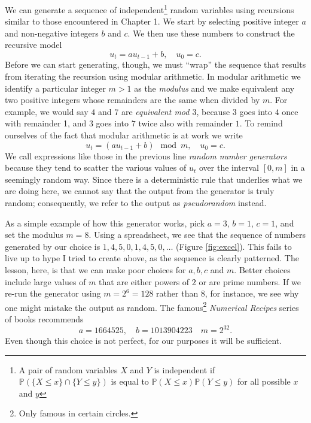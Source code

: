 \documentclass[../book.tex]{subfiles}
\begin{document}
We can generate a sequence of independent\footnote{A pair of random variables \(X\) and \(Y\) is independent if \(\mathbb{P} ( \{ X \leq x\} \cap\{  Y \leq y\} )\) is equal to \(\mathbb{P}(X \leq x) \mathbb{P}(Y\leq y)\) for all possible \(x\) and \(y\)} random variables using recursions similar to those encountered in Chapter 1. We start by selecting positive integer \(a\) and non-negative integers \(b\) and \(c\). We then use these numbers to construct the recursive model
\begin{equation}\label{eq:rv-8}
u_t = a u_{t-1} + b, \quad u_0 = c.
\end{equation}
Before we can start generating, though, we must ``wrap'' the sequence that results from iterating the recursion using modular arithmetic. In modular arithmetic we identify a particular integer \(m>1\) as the \emph{modulus} and we make equivalent any two positive integers whose remainders are the same when divided by \(m\). For example, we would say \(4\) and \(7\) are \emph{equivalent mod \(3\)}, because \(3\) goes into \(4\) once with remainder 1, and \(3\) goes into \(7\) twice also with remainder \(1\). To remind ourselves of the fact that modular arithmetic is at work we write
\begin{equation}\label{eq:rv-9}
u_t = ( a u_{t-1} + b) \mod m, \quad u_0 = c.
\end{equation}
We call expressions like those in the previous line \emph{random number generators} because they tend to scatter the various values of \(u_t\) over the interval \([0,m]\) in a seemingly random way. Since there is a deterministic rule that underlies what we are doing here, we cannot say that the output from the generator is truly random; consequently, we refer to the output as \emph{pseudorandom} instead.

As a simple example of how this generator works, pick \(a=3\), \(b=1\), \(c=1\), and set the modulus \(m=8\). Using a spreadsheet, we see that the sequence of numbers generated by our choice is \(1, 4, 5, 0, 1, 4, 5, 0, \ldots\) (Figure \ref{fig:excel}). This fails to live up to hype I tried to create above, as the sequence is clearly patterned. The lesson, here, is that we can make poor choices for \(a, b, c\) and \(m\). Better choices include large values of \(m\) that are either powers of \(2\) or are prime numbers. If we re-run the generator using \(m=2^6 = 128\) rather than \(8\), for instance, we see why one might mistake the output as random. The famous\footnote{Only famous in certain circles.} \emph{Numerical Recipes} series of books recommends
\begin{equation}\label{eq:rv-10}
a = 1 664 525, \quad b = 1 013 904 223 \quad m = 2^{32}.
\end{equation}
Even though this choice is not perfect, for our purposes it will be sufficient.
\end{document}
